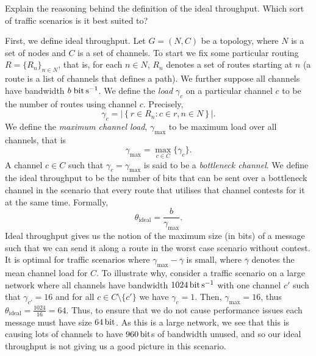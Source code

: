 
  \question Explain the reasoning behind the definition of the ideal throughput. Which sort of traffic scenarios is it best suited to?
  \begin{solution}
    First, we define ideal throughput. Let $G = (N, C)$ be a topology, where $N$ is a set of nodes and $C$ is a set of channels. To start we fix some particular routing $R = \{R_n\}_{n \in N}$, that is, for each $n \in N$, $R_n$ denotes a set of routes starting at $n$ (a route is a list of channels that defines a path). We further suppose all channels have bandwidth $b\;\si{\bit\per\second}$. We define the \emph{load} $\gamma_c$ on a particular channel $c$ to be the number of routes using channel $c$. Precisely,
    \[ \gamma_c = \left\lvert \left\{ r \in R_n: c \in r, n \in N \right\} \right\rvert. \]
    We define the \emph{maximum channel load}, $\gamma_\text{max}$ to be maximum load over all channels, that is
    \[ \gamma_\text{max} = \max_{c \in C} \{\gamma_c\}. \]
    A channel $c \in C$ such that $\gamma_c = \gamma_\text{max}$ is said to be a \emph{bottleneck channel}.
    We define the ideal throughput to be the number of bits that can be sent over a bottleneck channel in the scenario that every route that utilises that channel contests for it at the same time. Formally,
    \[ \theta_{\text{ideal}} = \frac{b}{\gamma_\text{max}}. \]
    Ideal throughput gives us the notion of the maximum size (in bits) of a message such that we can send it along a route in the worst case scenario without contest. It is optimal for traffic scenarios where $\gamma_\text{max} - \overline\gamma$ is small, where $\overline\gamma$ denotes the mean channel load for $C$. To illustrate why, consider a traffic scenario on a large network where all channels have bandwidth $\SI{1024}{\bit\per\second}$ with one channel $c'$ such that $\gamma_{c'} = 16$ and for all $c \in C \setminus \{c'\}$ we have $\gamma_c = 1$. Then, $\gamma_\text{max} = 16$, thus $\theta_\text{ideal} = \frac{1024}{16} = 64$. Thus, to ensure that we do not cause performance issues each message must have size $\SI{64}{\bit}$. As this is a large network, we see that this is causing lots of channels to have $\SI{960}{\bit}$s of bandwidth unused, and so our ideal throughput is not giving us a good picture in this scenario.
  \end{solution}

